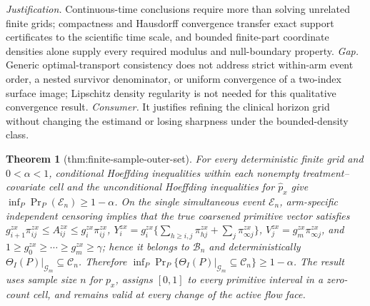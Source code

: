 \documentclass{article}
\newtheorem{theorem}{Theorem}
\begin{document}
\par\smallskip\noindent \textit{Justification.} Continuous-time conclusions require more than solving unrelated finite grids; compactness and Hausdorff convergence transfer exact support certificates to the scientific time scale, and bounded finite-part coordinate densities alone supply every required modulus and null-boundary property. \textit{Gap.} Generic optimal-transport consistency does not address strict within-arm event order, a nested survivor denominator, or uniform convergence of a two-index surface image; Lipschitz density regularity is not needed for this qualitative convergence result. \textit{Consumer.} It justifies refining the clinical horizon grid without changing the estimand or losing sharpness under the bounded-density class.

\begin{theorem}[thm:finite-sample-outer-set]\label{thm:finite-sample-outer-set}
For every deterministic finite grid and \(0<\alpha<1\), conditional Hoeffding inequalities within each nonempty treatment--covariate cell and the unconditional Hoeffding inequalities for \(\widehat p_x\) give \(\inf_P\Pr_P(\mathscr E_n)\ge1-\alpha\). On the single simultaneous event \(\mathscr E_n\), arm-specific independent censoring implies that the true coarsened primitive vector satisfies \(g^{zx}_{i+1}\pi^{zx}_{ij}\le A^{zx}_{ij}\le g^{zx}_i\pi^{zx}_{ij}\), \(Y^{zx}_i=g^{zx}_i\{\sum_{h\ge i,j}\pi^{zx}_{hj}+\sum_j\pi^{zx}_{\infty j}\}\), \(V^{zx}_j=g^{zx}_m\pi^{zx}_{\infty j}\), and \(1\ge g^{zx}_0\ge\cdots\ge g^{zx}_m\ge\gamma\); hence it belongs to \(\mathcal B_n\) and deterministically \(\Theta_I(P)|_{\mathcal G_m}\subseteq\mathcal C_n\). Therefore \(\inf_P\Pr_P\{\Theta_I(P)|_{\mathcal G_m}\subseteq\mathcal C_n\}\ge1-\alpha\). The result uses sample size \(n\) for \(p_x\), assigns \([0,1]\) to every primitive interval in a zero-count cell, and remains valid at every change of the active flow face.
\end{theorem}
\end{document}
